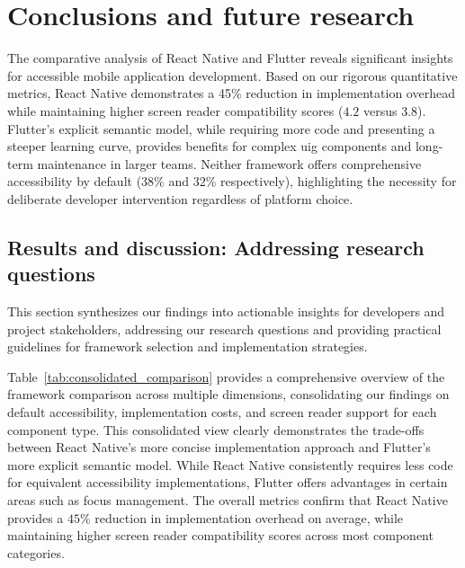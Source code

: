 \chapter{Conclusions and future research}
\label{chap:conclusions}

The comparative analysis of React Native and Flutter reveals significant insights for accessible mobile application development. Based on our rigorous quantitative metrics, React Native demonstrates a 45\% reduction in implementation overhead while maintaining higher screen reader compatibility scores ($4.2$ versus $3.8$). Flutter's explicit semantic model, while requiring more code and presenting a steeper learning curve, provides benefits for complex \gls{uig} components and long-term maintenance in larger teams. Neither framework offers comprehensive accessibility by default ($38$\% and $32$\% respectively), highlighting the necessity for deliberate developer intervention regardless of platform choice.

\section{Results and discussion: Addressing research questions}
\label{sec:results-discussion}

This section synthesizes our findings into actionable insights for developers and project stakeholders, addressing our research questions and providing practical guidelines for framework selection and implementation strategies.

Table~\ref{tab:consolidated_comparison} provides a comprehensive overview of the framework comparison across multiple dimensions, consolidating our findings on default accessibility, implementation costs, and screen reader support for each component type. This consolidated view clearly demonstrates the trade-offs between React Native's more concise implementation approach and Flutter's more explicit semantic model. While React Native consistently requires less code for equivalent accessibility implementations, Flutter offers advantages in certain areas such as focus management. The overall metrics confirm that React Native provides a $45$\% reduction in implementation overhead on average, while maintaining higher screen reader compatibility scores across most component categories.


